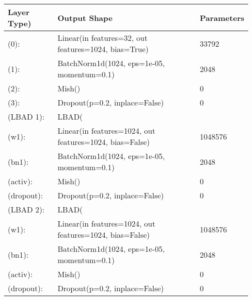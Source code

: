 

\begin{center}
    \begin{tabular}{ p{}| p{}| p{}}

        \textbf{Layer Type)} & \textbf{Output Shape}                                   & \textbf{Parameters} \\
        \hline

        (0):                 & Linear(in features=32, out features=1024, bias=True)    & 33792               \\
        (1):                 & BatchNorm1d(1024, eps=1e-05, momentum=0.1)              & 2048                \\
        (2):                 & Mish()                                                  & 0                   \\
        (3):                 & Dropout(p=0.2, inplace=False)                           & 0                   \\

        (LBAD 1):            & LBAD(                                                   &                     \\

        (w1):                & Linear(in features=1024, out features=1024, bias=False) & 1048576             \\
        (bn1):               & BatchNorm1d(1024, eps=1e-05, momentum=0.1)              & 2048                \\
        (activ):             & Mish()                                                  & 0                   \\
        (dropout):           & Dropout(p=0.2, inplace=False)                           & 0                   \\

        (LBAD 2):            & LBAD(                                                   &                     \\

        (w1):                & Linear(in features=1024, out features=1024, bias=False) & 1048576             \\
        (bn1):               & BatchNorm1d(1024, eps=1e-05, momentum=0.1)              & 2048                \\
        (activ):             & Mish()                                                  & 0                   \\
        (dropout):           & Dropout(p=0.2, inplace=False)                           & 0                   \\


\end{tabular}
\end{center}
